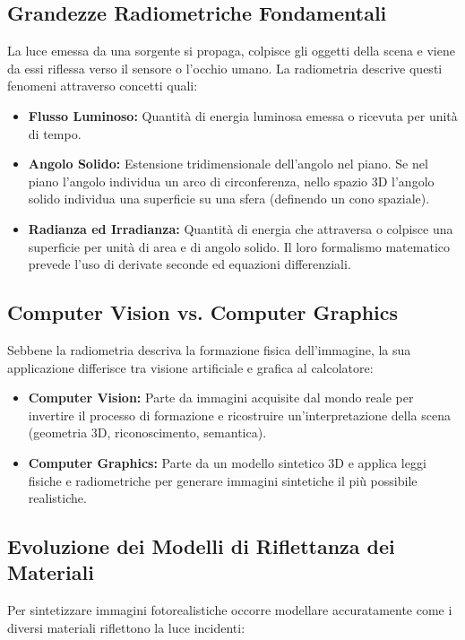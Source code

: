 \subsection{Grandezze Radiometriche Fondamentali}
La luce emessa da una sorgente si propaga, colpisce gli oggetti della scena e viene da essi riflessa verso il sensore o l'occhio umano. La radiometria descrive questi fenomeni attraverso concetti quali:
\begin{itemize}
    \item \textbf{Flusso Luminoso:} Quantità di energia luminosa emessa o ricevuta per unità di tempo.
    \item \textbf{Angolo Solido:} Estensione tridimensionale dell'angolo nel piano. Se nel piano l'angolo individua un arco di circonferenza, nello spazio $3\text{D}$ l'angolo solido individua una superficie su una sfera (definendo un cono spaziale).
    \item \textbf{Radianza ed Irradianza:} Quantità di energia che attraversa o colpisce una superficie per unità di area e di angolo solido. Il loro formalismo matematico prevede l'uso di derivate seconde ed equazioni differenziali.
\end{itemize}

\subsection{Computer Vision vs. Computer Graphics}
Sebbene la radiometria descriva la formazione fisica dell'immagine, la sua applicazione differisce tra visione artificiale e grafica al calcolatore:
\begin{itemize}
    \item \textbf{Computer Vision:} Parte da immagini acquisite dal mondo reale per invertire il processo di formazione e ricostruire un'interpretazione della scena (geometria $3\text{D}$, riconoscimento, semantica).
    \item \textbf{Computer Graphics:} Parte da un modello sintetico $3\text{D}$ e applica leggi fisiche e radiometriche per generare immagini sintetiche il più possibile realistiche.
\end{itemize}

\subsection{Evoluzione dei Modelli di Riflettanza dei Materiali}
Per sintetizzare immagini fotorealistiche occorre modellare accuratamente come i diversi materiali riflettono la luce incidenti:

